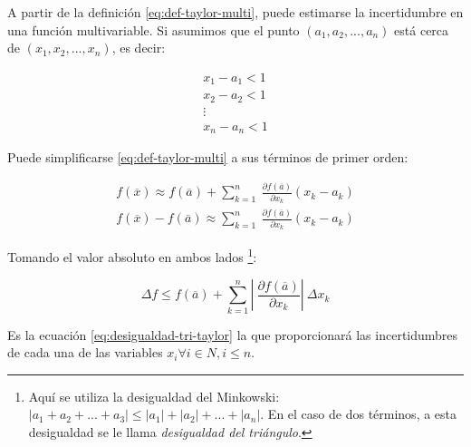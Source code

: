 A partir de la definición \ref{eq:def-taylor-multi}, puede estimarse la
incertidumbre en una función multivariable. Si asumimos que el punto $(a_1, a_2,
..., a_n)$ está cerca de $(x_1, x_2, ..., x_n)$, es decir:

\begin{align*}
	x_1 - a_1 < 1 \\
	x_2 - a_2 < 1 \\
	\vdots \\
	x_n - a_n < 1
\end{align*}

Puede simplificarse \ref{eq:def-taylor-multi} a sus términos de primer orden:

\begin{align*}
	f(\overline{x}) \approx f(\overline{a}) + \sum_{k=1}^{n} \
		\frac{\partial f(\overline{a})}{\partial x_k} (x_k - a_k) \\
	f(\overline{x}) - f(\overline{a}) \approx \sum_{k=1}^{n} \
		\frac{\partial f(\overline{a})}{\partial x_k} (x_k - a_k)
\end{align*}

Tomando el valor absoluto en ambos lados \footnote{Aquí se utiliza la
desigualdad del Minkowski: $|a_1 + a_2 + ... + a_3| \leq |a_1| + |a_2| + ... +
|a_n|$. En el caso de dos términos, a esta desigualdad se le llama
\textit{desigualdad del triángulo}.}:

\begin{equation} \label{eq:desigualdad-tri-taylor}
	\Delta f \leq f(\overline{a}) + \sum_{k=1}^{n} \left |\ 
		\frac{\partial f(\overline{a})}{\partial x_k} \right| \
		\Delta x_k
\end{equation}

Es la ecuación \ref{eq:desigualdad-tri-taylor} la que proporcionará las
incertidumbres de cada una de las variables $x_i \forall i \in N, i \leq n$.

